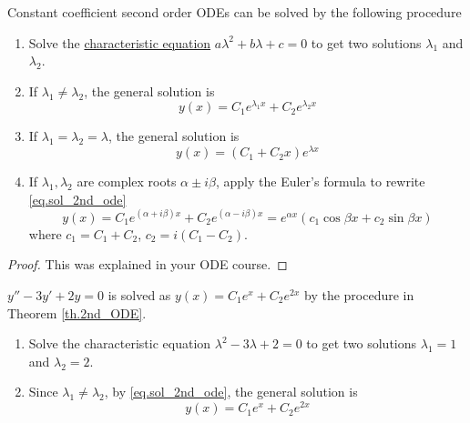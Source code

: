 \begin{theorem}[]\label{th.2nd_ODE}
    Constant coefficient second order ODEs can be solved by the following procedure
    \begin{enumerate}
        \item Solve the \underline{characteristic equation} $a\lambda^2 +  b\lambda + c = 0$ to get two solutions $\lambda_1$ and $\lambda_2$.
        \item If $\lambda_1\neq\lambda_2$, the general solution is 
        \begin{equation}\label{eq.sol_2nd_ode}
            y(x)=C_1 e^{\lambda_1 x}+C_2 e^{\lambda_2 x}
        \end{equation}
        \item If $\lambda_1=\lambda_2=\lambda$, the general solution is 
        \begin{equation}\label{eq.sol_2nd_ode_eqroot}
            y(x)=(C_1 + C_2x) e^{\lambda x}
        \end{equation}
        \item If $\lambda_1, \lambda_2$ are complex roots $\alpha \pm i\beta$, apply the Euler's formula to rewrite \eqref{eq.sol_2nd_ode}
        \begin{equation}\label{eq.sol_2nd_ode_complex}
            y(x)=C_1 e^{(\alpha+i \beta) x}+C_2 e^{(\alpha-i \beta) x}=e^{\alpha x}\left(c_1 \cos \beta x+c_2 \sin \beta x\right)
        \end{equation}
        where $c_1=C_1+C_2$, $c_2=i(C_1-C_2)$.
    \end{enumerate}
\end{theorem}
\begin{proof}
    This was explained in your ODE course.
\end{proof}

\begin{example}[]
    $y'' - 3y' + 2y = 0$ is solved as $y(x)=C_1e^{x}+C_2e^{2x}$ by the procedure in Theorem \ref{th.2nd_ODE}.
    \begin{enumerate}
        \item Solve the characteristic equation $\lambda^2 - 3\lambda + 2 = 0$ to get two solutions $\lambda_1 = 1$ and $\lambda_2 = 2$.
        \item Since $\lambda_1\neq\lambda_2$, by \eqref{eq.sol_2nd_ode}, the general solution is 
        \begin{equation}
            y(x)=C_1 e^{x}+C_2 e^{2x}
        \end{equation}
    \end{enumerate}
\end{example}

